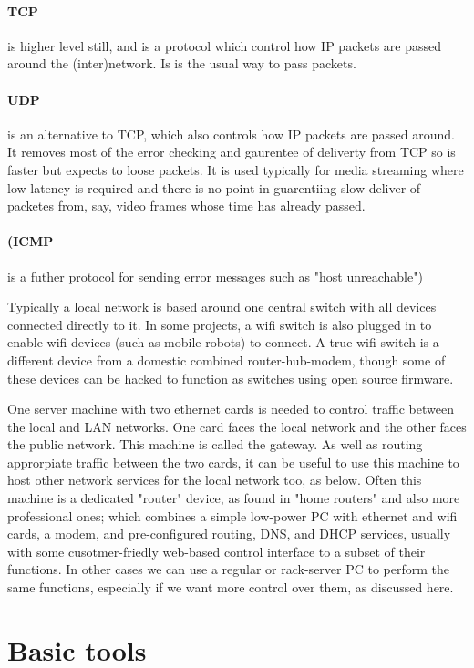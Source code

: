 \documentclass[oneside,english]{scrbook}
\begin{document}
\paragraph{TCP} is higher level still, and is a protocol which control how IP packets are passed around the (inter)network. Is is the usual way to pass packets.
\paragraph{UDP} is an alternative to TCP, which also controls how IP packets are passed around. It removes most of the error checking and gaurentee of deliverty from TCP so is faster but expects to loose packets. It is used typically for media streaming where low latency is required and there is no point in guarentiing slow deliver of packetes from, say, video frames whose time has already passed.

\paragraph{(ICMP} is a futher protocol for sending error messages such as "host unreachable")

Typically a local network is based around one central switch with
all devices connected directly to it. In some projects, a wifi switch
is also plugged in to enable wifi devices (such as mobile robots)
to connect. A true wifi switch is a different device from a domestic combined
router-hub-modem, though some of these devices can be hacked to function
as switches using open source firmware.

One server machine with two ethernet cards is needed to control traffic
between the local and LAN networks. One card faces the local network and the other faces the public network.  This machine is called the gateway.
As well as routing approrpiate traffic between the two cards, it can be useful to use this machine to host other network services for the local network too, as below.  Often this machine is a dedicated "router" device, as found in "home routers" and also more professional ones; which combines a simple low-power PC with ethernet and wifi cards, a modem, and pre-configured routing, DNS, and DHCP services, usually with some cusotmer-friedly web-based control interface to a subset of their functions. In other cases we can use a regular or rack-server PC to perform the same functions, especially if we want more control over them, as discussed here.

\section{Basic tools}
\end{document}

